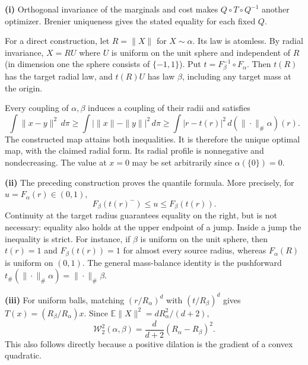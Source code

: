 \documentclass[11pt,a4paper]{article}
\theoremstyle{exostyle}
\newcommand{\Wtwo}{\mathcal{W}_2}
\begin{document}
\begin{solution}
\textbf{(i)} Orthogonal invariance of the marginals and cost makes $Q\circ T\circ Q^{-1}$ another optimizer. Brenier uniqueness gives the stated equality for each fixed $Q$.

For a direct construction, let $R=\|X\|$ for $X\sim\alpha$. Its law is atomless. By radial invariance, $X=RU$ where $U$ is uniform on the unit sphere and independent of $R$ (in dimension one the sphere consists of $\{-1,1\}$). Put $t=F_\beta^{-1}\circ F_\alpha$. Then $t(R)$ has the target radial law, and $t(R)U$ has law $\beta$, including any target mass at the origin.

Every coupling of $\alpha,\beta$ induces a coupling of their radii and satisfies
\[
\int\|x-y\|^2\,d\pi\ge\int|\|x\|-\|y\||^2\,d\pi
\ge\int|r-t(r)|^2\,d(\|\cdot\|_\#\alpha)(r).
\]
The constructed map attains both inequalities. It is therefore the unique optimal map, with the claimed radial form. Its radial profile is nonnegative and nondecreasing. The value at $x=0$ may be set arbitrarily since $\alpha(\{0\})=0$.

\textbf{(ii)} The preceding construction proves the quantile formula. More precisely, for $u=F_\alpha(r)\in(0,1)$,
\[
F_\beta(t(r)^-)\le u\le F_\beta(t(r)).
\]
Continuity at the target radius guarantees equality on the right, but
is not necessary: equality also holds at the upper endpoint of a jump.
Inside a jump the inequality is strict. For instance, if $\beta$ is
uniform on the unit sphere, then $t(r)=1$ and $F_\beta(t(r))=1$ for
almost every source radius, whereas $F_\alpha(R)$ is uniform on $(0,1)$.
The general mass-balance identity is the pushforward
$t_\#(\|\cdot\|_\#\alpha)=\|\cdot\|_\#\beta$.

\textbf{(iii)} For uniform balls, matching $(r/R_\alpha)^d$ with $(t/R_\beta)^d$ gives $T(x)=(R_\beta/R_\alpha)x$. Since $\mathbb E\|X\|^2=dR_\alpha^2/(d+2)$,
\[
\Wtwo^2(\alpha,\beta)=\frac{d}{d+2}(R_\alpha-R_\beta)^2.
\]
This also follows directly because a positive dilation is the gradient of a convex quadratic.
\end{solution}
\end{document}
